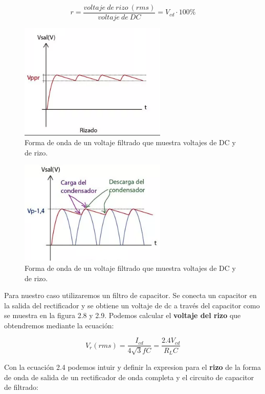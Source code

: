 \begin{equation}
r=\frac{voltaje\:  de\:  rizo\:  (rms)}{voltaje\:  de\:  DC}=V_{cd}\cdot 100\%
\end{equation}

\begin{figure}[H]
\centering
\includegraphics[width=7cm]{capitulo3/figs/risado.png}
\caption{ Forma de onda de un voltaje filtrado que muestra voltajes de DC y de rizo.}
\end{figure}

\begin{figure}[H]
\centering
\includegraphics[width=7cm]{capitulo3/figs/filtro.png}
\caption{ Forma de onda de un voltaje filtrado que muestra voltajes de DC y de rizo.}
\end{figure}

Para nuestro caso utilizaremos un filtro de capacitor. Se conecta un capacitor en la salida del rectificador y se obtiene un voltaje de dc a través del capacitor como se muestra en la figura 2.8 y 2.9. Podemos calcular el \textbf{voltaje del rizo} que obtendremos mediante la ecuación:

\begin{equation}
V_{r}(rms)=\dfrac{I_{cd}}{4\sqrt{3}fC}=\dfrac{2.4V_{cd}}{R_{L}C}
\end{equation}

Con la ecuación 2.4 podemos intuir y definir la expresion para el \textbf{rizo} de la forma de onda de salida de un rectificador de onda completa y el circuito de capacitor de filtrado:

